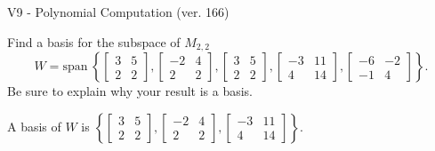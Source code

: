 \begin{exercise}
  \begin{exerciseTitle}V9 - Polynomial Computation (ver. 166)\end{exerciseTitle}
  \begin{exerciseStatement}
    Find a basis for the subspace of \(M_{2,2}\) 
\[W=\mathrm{span}\ \left\{\left[\begin{array}{cc}
3 & 5 \\
2 & 2
\end{array}\right] , \left[\begin{array}{cc}
-2 & 4 \\
2 & 2
\end{array}\right] , \left[\begin{array}{cc}
3 & 5 \\
2 & 2
\end{array}\right] , \left[\begin{array}{cc}
-3 & 11 \\
4 & 14
\end{array}\right] , \left[\begin{array}{cc}
-6 & -2 \\
-1 & 4
\end{array}\right]\right\}.\]
 Be sure to explain why your result is a basis.


  \end{exerciseStatement}
  \begin{exerciseAnswer}
   A basis of \(W\) is  \(\left\{\left[\begin{array}{cc}
3 & 5 \\
2 & 2
\end{array}\right] , \left[\begin{array}{cc}
-2 & 4 \\
2 & 2
\end{array}\right] , \left[\begin{array}{cc}
-3 & 11 \\
4 & 14
\end{array}\right]\right\}\).
  


  \end{exerciseAnswer}
\end{exercise}